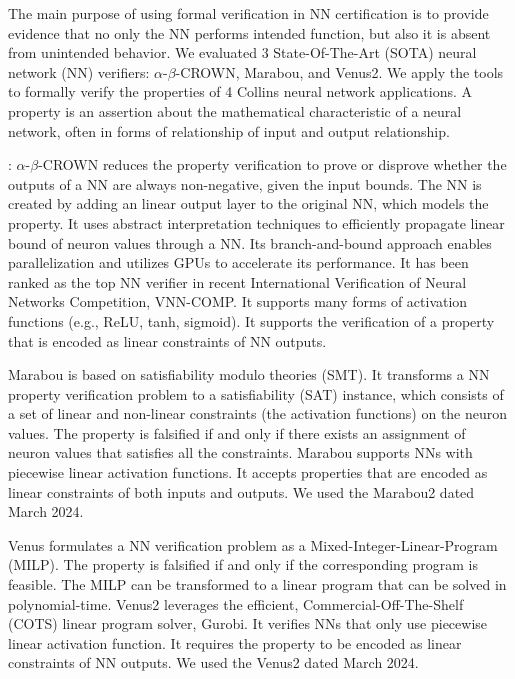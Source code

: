 The main purpose of using formal verification in NN certification is to provide evidence that no only the NN performs intended function, but also it is absent from unintended behavior. 
We evaluated 3 State-Of-The-Art (SOTA) neural network (NN) verifiers: $\alpha$-$\beta$-CROWN, Marabou, and Venus2. We apply the tools to formally verify the properties of 4 Collins neural network applications. A property is an assertion about the mathematical characteristic of a neural network, often in forms of relationship of input and output relationship.

: 
$\alpha$-$\beta$-CROWN reduces the property verification to prove or disprove whether the  outputs of a NN are always non-negative, given the input bounds. The NN is created by adding an linear output layer to the original NN, which models the property. It uses abstract interpretation techniques to efficiently propagate linear bound of neuron values through a NN. Its branch-and-bound approach enables parallelization and utilizes GPUs to accelerate its performance. It has been ranked as the top NN verifier in recent International Verification of Neural Networks Competition, VNN-COMP. It supports many forms of activation functions (e.g., ReLU, tanh, sigmoid).
It supports the verification of a property that is encoded as linear constraints of NN outputs.

Marabou is based on satisfiability modulo theories (SMT). It transforms a NN property verification problem to a satisfiability (SAT) instance, which consists of a set of linear and non-linear constraints (the activation functions) on the neuron values. The property is falsified if and only if  there exists an assignment of neuron values that satisfies all the constraints. Marabou supports NNs with piecewise linear activation functions. It accepts properties that are encoded as linear constraints of both inputs and outputs. We used the Marabou2 dated March 2024.

Venus formulates a NN verification problem as a Mixed-Integer-Linear-Program (MILP). The property is falsified if and only if the corresponding program is feasible. The MILP can be transformed to a linear program that can be solved in polynomial-time. Venus2 leverages the efficient, Commercial-Off-The-Shelf (COTS) linear program solver, Gurobi. It verifies NNs that only use piecewise linear activation function. It requires the property to be encoded as linear constraints of NN outputs. We used the Venus2 dated March 2024.

